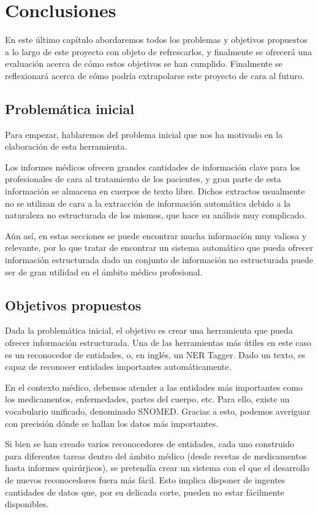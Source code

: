 \chapter{Conclusiones}
En este último capítulo abordaremos todos los problemas y objetivos propuestos a lo largo de este proyecto con objeto de refrescarlos, y finalmente se ofrecerá una evaluación acerca de cómo estos objetivos se han cumplido. Finalmente se reflexionará acerca de cómo podría extrapolarse este proyecto de cara al futuro.

\section{Problemática inicial}
Para empezar, hablaremos del problema inicial que nos ha motivado en la elaboración de esta herramienta.

Los informes médicos ofrecen grandes cantidades de información clave para los profesionales de cara al tratamiento de los pacientes, y gran parte de esta información se almacena en cuerpos de texto libre. Dichos extractos usualmente no se utilizan de cara a la extracción de información automática debido a la naturaleza no estructurada de los mismos, que hace su análisis muy complicado.

Aún así, en estas secciones se puede encontrar mucha información muy valiosa y relevante, por lo que tratar de encontrar un sistema automático que pueda ofrecer información estructurada dado un conjunto de información no estructurada puede ser de gran utilidad en el ámbito médico profesional.

\section{Objetivos propuestos}
Dada la problemática inicial, el objetivo es crear una herramienta que pueda ofrecer información estructurada. Una de las herramientas más útiles en este caso es un reconocedor de entidades, o, en inglés, un NER Tagger. Dado un texto, es capaz de reconocer entidades importantes automáticamente.

En el contexto médico, debemos atender a las entidades más importantes como los medicamentos, enfermedades, partes del cuerpo, etc. Para ello, existe un vocabulario unificado, denominado SNOMED. Gracias a esto, podemos averiguar con precisión dónde se hallan los datos más importantes.

Si bien se han creado varios reconocedores de entidades, cada uno construido para diferentes tareas dentro del ámbito médico (desde recetas de medicamentos hasta informes quirúrjicos), se pretendía crear un sistema con el que el desarrollo de nuevos reconocedores fuera más fácil. Esto implica disponer de ingentes cantidades de datos que, por su delicada corte, pueden no estar fácilmente disponibles.


